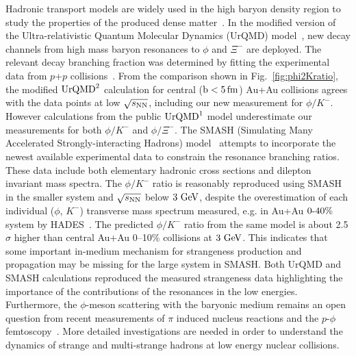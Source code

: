 \documentclass[aps,tightenlines,superscriptaddress,twocolumn]{revtex4-1}
\begin{document}
Hadronic transport models are widely used in the high baryon density region to study the properties of the produced dense matter~\cite{UrQMD_2:1998,urQMD:1999,Hartnack:2011cn,Steinheimer_2015_UrQMD,Elfner_SMASH:2019,Song:2020clw}. In the modified version of the Ultra-relativistic Quantum Molecular Dynamics (UrQMD) model~\cite{Steinheimer_2015_UrQMD}, new decay channels from high mass baryon resonances to $\phi$ and $\Xi^-$ are deployed. The relevant decay branching fraction was determined by fitting the experimental data from $p$+$p$ collisions~\cite{ANKE_phi:2008}. From the comparison shown in Fig.~\ref{fig:phi2Kratio}, the modified $\textup{UrQMD}^{2}$ calculation for central ($\rm{b}<5\,\rm{fm}$) Au+Au collisions agrees with the data points at low ${\sqrt{s_{\rm NN}}}$, including our new measurement for $\phi/K^-$.
However calculations from the public $\textup{UrQMD}^{1}$ model underestimate our measurements for both $\phi/K^-$ and $\phi/\Xi^-$. The SMASH (Simulating Many Accelerated Strongly-interacting Hadrons) model~\cite{Elfner_SMASH:2019} attempts to incorporate the newest available experimental data to constrain the resonance branching ratios. These data include both elementary hadronic cross sections and dilepton invariant mass spectra. The $\phi/K^-$ ratio is reasonably reproduced using SMASH in the smaller system and ${\sqrt{s_{\rm NN}}}$ below $\textup{3 GeV}$, despite the overestimation of each individual ($\phi$, $K^-$) transverse mass spectrum measured, e.g. in Au+Au $\textup{0-40\%}$ system by HADES~\cite{HADES_phi_AuAu:2018,Elfner_SMASH:2019}. The predicted $\phi/K^-$ ratio from the same model is about 2.5$\sigma$ higher than central Au+Au 0--10\% collisions at $\textup{3 GeV}$. This indicates that some important in-medium mechanism for strangeness production and propagation may be missing for the large system in SMASH. %
Both UrQMD and SMASH calculations reproduced the measured strangeness data highlighting the importance of the contributions of the resonances in the low energies. 
Furthermore, the $\phi$-meson scattering with the baryonic medium remains an open question from recent measurements of $\pi$ induced nucleus reactions and the $p$-$\phi$ femtoscopy~\cite{HADES_PRL_W_C:2019,ALICE_PRL_pp:2021}. More detailed investigations are needed in order to understand the dynamics of strange and multi-strange hadrons at low energy nuclear collisions.
\end{document}
